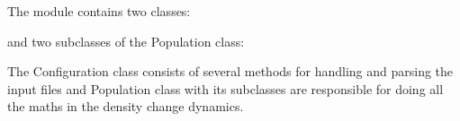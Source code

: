 \documentclass[letterpaper,10pt,english]{sphinxmanual}
\begin{document}
The module contains two classes:

\begin{sphinxVerbatim}[commandchars=\\\{\}]
\end{sphinxVerbatim}

and two subclasses of the Population class:

\begin{sphinxVerbatim}[commandchars=\\\{\}]
\end{sphinxVerbatim}

The Configuration class consists of several methods for handling and parsing
the input files and Population class with its subclasses are responsible
for doing all the maths in the density change dynamics.
\end{document}
